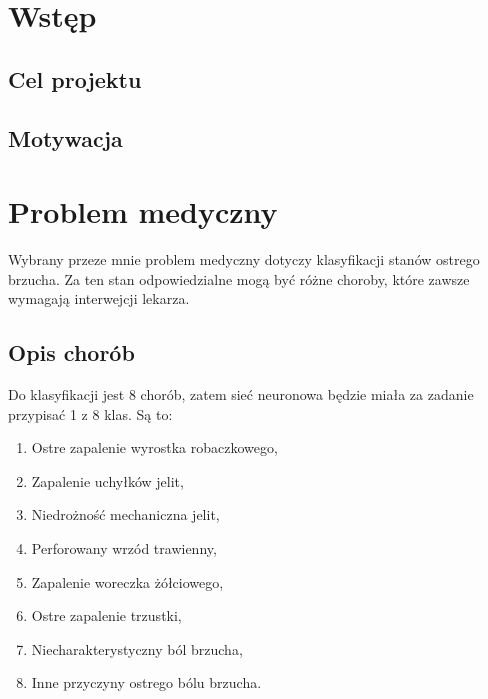 %





    \maketitle
    \tableofcontents

    \chapter{Wstęp}\label{ch:wstęp}

    \section{Cel projektu}\label{sec:celProjektu}

    \section{Motywacja}\label{sec:motywacja}

    \chapter{Problem medyczny}\label{ch:problemMedyczny}

    Wybrany przeze mnie problem medyczny dotyczy klasyfikacji stanów ostrego brzucha.
    Za ten stan odpowiedzialne mogą być różne choroby, które zawsze wymagają interwejcji lekarza.

    \section{Opis chorób}\label{sec:opisChorób}

    Do klasyfikacji jest 8 chorób, zatem sieć neuronowa będzie miała za zadanie przypisać 1 z 8 klas.
    Są to:
    \begin{enumerate}
        \item Ostre zapalenie wyrostka robaczkowego,
        \item Zapalenie uchyłków jelit,
        \item Niedrożność mechaniczna jelit,
        \item Perforowany wrzód trawienny,
        \item Zapalenie woreczka żółciowego,
        \item Ostre zapalenie trzustki,
        \item Niecharakterystyczny ból brzucha,
        \item Inne przyczyny ostrego bólu brzucha.
    \end{enumerate}

